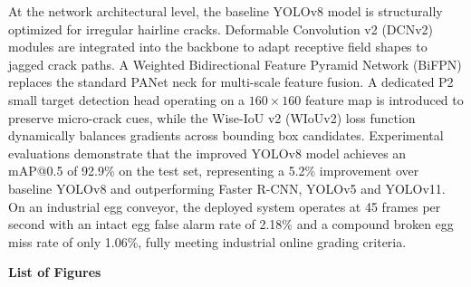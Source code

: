 \documentclass[12pt,a4paper]{report}
\begin{document}
At the network architectural level, the baseline YOLOv8 model is structurally optimized for irregular hairline cracks. Deformable Convolution v2 (DCNv2) modules are integrated into the backbone to adapt receptive field shapes to jagged crack paths. A Weighted Bidirectional Feature Pyramid Network (BiFPN) replaces the standard PANet neck for multi-scale feature fusion. A dedicated P2 small target detection head operating on a $160 \times 160$ feature map is introduced to preserve micro-crack cues, while the Wise-IoU v2 (WIoUv2) loss function dynamically balances gradients across bounding box candidates. Experimental evaluations demonstrate that the improved YOLOv8 model achieves an mAP@0.5 of 92.9\% on the test set, representing a 5.2\% improvement over baseline YOLOv8 and outperforming Faster R-CNN, YOLOv5 and YOLOv11. On an industrial egg conveyor, the deployed system operates at 45 frames per second with an intact egg false alarm rate of 2.18\% and a compound broken egg miss rate of only 1.06\%, fully meeting industrial online grading criteria.

\clearpage


\tableofcontents

\clearpage


\clearpage
{}
\thispagestyle{fancy}

\vspace*{-0.5cm}
{\centering\fontsize{24}{28}\selectfont\bfseries List of Figures\par}
\vspace{0.8cm}
\end{document}
